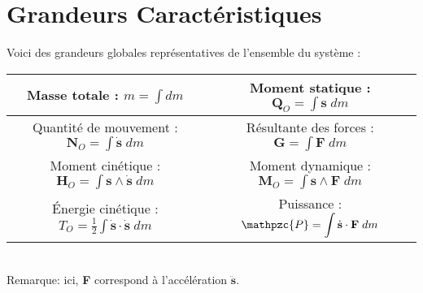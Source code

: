 \documentclass[a4paper]{article}
\begin{document}
\section{Grandeurs Caractéristiques}





Voici des grandeurs globales représentatives de l’ensemble du système : 
\begin{center} \begin{tabular}{|c|c|} \hline
Masse totale : $\displaystyle m = \int d m $ & Moment statique : $\displaystyle \textbf{Q}_O = \int \textbf{s} \; d m $ \\ \hline
Quantité de mouvement : $\displaystyle \textbf{N}_O = \int \dot{\textbf{s}} \; d m $ & Résultante des forces : $\displaystyle \textbf{G} = \int \textbf{F} \; d m $ \\ \hline
Moment cinétique : $\displaystyle \textbf{H}_O = \int \textbf{s} \wedge \dot{\textbf{s}} \; d m $ & Moment dynamique : $\displaystyle \textbf{M}_O = \int \textbf{s} \wedge \textbf{F} \; d m $ \\ \hline
Énergie cinétique : $\displaystyle T_O = \frac{1}{2} \int \dot{\textbf{s}} \cdot \dot{\textbf{s}} \; d m $ & Puissance : $\displaystyle \mathpzc{P} = \int \dot{\textbf{s}} \cdot \textbf{F} \; d m $ \\ \hline  \end{tabular} \\
Remarque: ici, \textbf{F} correspond à l'accélération $ \ddot{\textbf{s}} $.
\end{center}
\end{document}

